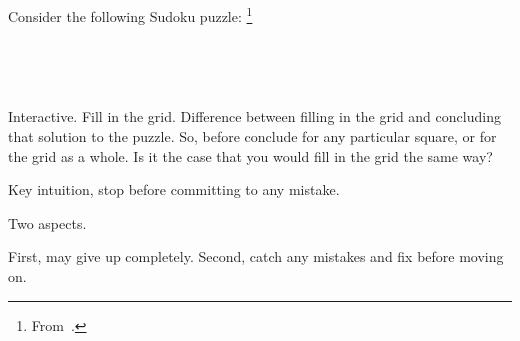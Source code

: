 \begin{note}
  \begin{illustration}[Sudoku]
    \label{illu:gist:sudoku}
    Consider the following Sudoku puzzle:%
    \footnote{
      From~\textcite[84]{Coussement:2007up}.
    }
    \vspace{\baselineskip}

    \mbox{ }\hfill%
    \begin{adjustbox}{minipage=0.45\linewidth,scale=1}
      \centering
    \end{adjustbox}%
    \hfill\mbox{ }
  \end{illustration}

  Interactive.
  Fill in the grid.
  Difference between filling in the grid and concluding that solution to the puzzle.
  So, before conclude for any particular square, or for the grid as a whole.
  Is it the case that you would fill in the grid the same way?

  Key intuition, stop before committing to any mistake.

  Two aspects.

  First, may give up completely.
  Second, catch any mistakes and fix before moving on.
\end{note}


